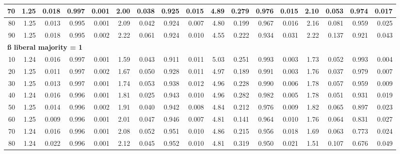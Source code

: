 \documentclass[
]{article}
\begin{document}
\begin{table}[H]
{\begin{tabular}{r|r|r|r|r|r|r|r|r|r|r|r|r|r|r|r|r}
\hline
\hspace{1em}70 & 1.25 & 0.018 & 0.997 & 0.001 & 2.00 & 0.038 & 0.925 & 0.015 & 4.89 & 0.279 & 0.976 & 0.015 & 2.10 & 0.053 & 0.974 & 0.017\\
\hline
\hspace{1em}80 & 1.25 & 0.013 & 0.995 & 0.001 & 2.09 & 0.042 & 0.924 & 0.007 & 4.80 & 0.199 & 0.967 & 0.016 & 2.16 & 0.081 & 0.959 & 0.025\\
\hline
\hspace{1em}90 & 1.25 & 0.018 & 0.995 & 0.002 & 2.22 & 0.061 & 0.924 & 0.010 & 4.55 & 0.222 & 0.934 & 0.031 & 2.22 & 0.137 & 0.921 & 0.043\\
\hline
\multicolumn{17}{l}{\textbf{ß liberal majority = 1}}\\
\hline
\hspace{1em}10 & 1.24 & 0.016 & 0.997 & 0.001 & 1.59 & 0.043 & 0.911 & 0.011 & 5.03 & 0.251 & 0.993 & 0.003 & 1.73 & 0.052 & 0.993 & 0.004\\
\hline
\hspace{1em}20 & 1.25 & 0.011 & 0.997 & 0.002 & 1.67 & 0.050 & 0.928 & 0.011 & 4.97 & 0.189 & 0.991 & 0.003 & 1.76 & 0.037 & 0.979 & 0.007\\
\hline
\hspace{1em}30 & 1.25 & 0.013 & 0.997 & 0.001 & 1.74 & 0.053 & 0.938 & 0.012 & 4.96 & 0.228 & 0.990 & 0.006 & 1.78 & 0.057 & 0.959 & 0.009\\
\hline
\hspace{1em}40 & 1.24 & 0.016 & 0.996 & 0.001 & 1.81 & 0.025 & 0.943 & 0.010 & 4.96 & 0.282 & 0.982 & 0.005 & 1.78 & 0.051 & 0.931 & 0.019\\
\hline
\hspace{1em}50 & 1.25 & 0.014 & 0.996 & 0.002 & 1.91 & 0.040 & 0.942 & 0.008 & 4.84 & 0.212 & 0.976 & 0.009 & 1.82 & 0.065 & 0.897 & 0.023\\
\hline
\hspace{1em}60 & 1.25 & 0.009 & 0.996 & 0.001 & 2.01 & 0.047 & 0.946 & 0.007 & 4.81 & 0.141 & 0.964 & 0.010 & 1.76 & 0.064 & 0.831 & 0.027\\
\hline
\hspace{1em}70 & 1.24 & 0.016 & 0.996 & 0.001 & 2.08 & 0.052 & 0.951 & 0.010 & 4.86 & 0.215 & 0.956 & 0.018 & 1.69 & 0.063 & 0.773 & 0.024\\
\hline
\hspace{1em}80 & 1.24 & 0.022 & 0.996 & 0.001 & 2.12 & 0.045 & 0.952 & 0.010 & 4.81 & 0.319 & 0.950 & 0.021 & 1.51 & 0.107 & 0.676 & 0.049\\

\end{tabular}}
\end{table}
\end{document}
